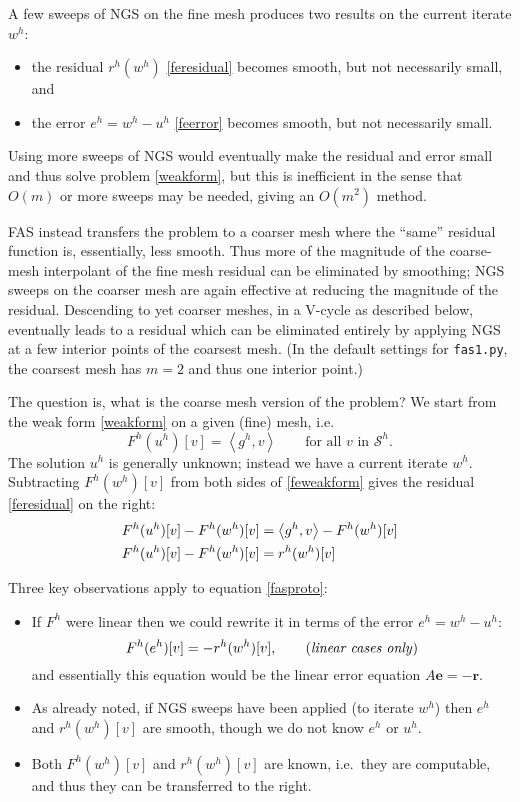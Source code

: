\documentclass[letterpaper,final,12pt,reqno]{amsart}
\newcommand{\be}{\mathbf{e}}
\newcommand{\br}{\mathbf{r}}
\newcommand{\ip}[2]{\left<#1,#2\right>}
\begin{document}
A few sweeps of NGS on the fine mesh produces two results on the current iterate $w^h$:
\begin{itemize}
\item the residual $r^h(w^h)$ \eqref{feresidual} becomes smooth, but not necessarily small, and
\item the error $e^h = w^h - u^h$ \eqref{feerror} becomes smooth, but not necessarily small.
\end{itemize}
Using more sweeps of NGS would eventually make the residual and error small and thus solve problem \eqref{weakform}, but this is inefficient in the sense that $O(m)$ or more sweeps may be needed, giving an $O(m^2)$ method.

FAS instead transfers the problem to a coarser mesh where the ``same'' residual function is, essentially, less smooth.  Thus more of the magnitude of the coarse-mesh interpolant of the fine mesh residual can be eliminated by smoothing; NGS sweeps on the coarser mesh are again effective at reducing the magnitude of the residual.  Descending to yet coarser meshes, in a V-cycle as described below, eventually leads to a residual which can be eliminated entirely by applying NGS at a few interior points of the coarsest mesh.  (In the default settings for \texttt{fas1.py}, the coarsest mesh has $m=2$ and thus one interior point.)

The question is, what is the coarse mesh version of the problem?  We start from the weak form \eqref{weakform} on a given (fine) mesh, i.e.
\begin{equation}
  F^h(u^h)[v] = \ip{g^h}{v} \qquad \text{for all } v \text{ in } \mathcal{S}^h.  \label{feweakform}
\end{equation}
The solution $u^h$ is generally unknown; instead we have a current iterate $w^h$.  Subtracting $F^h(w^h)[v]$ from both sides of \eqref{feweakform} gives the residual \eqref{feresidual} on the right:
\begin{align}
  F^h(u^h)[v] - F^h(w^h)[v] &= \ip{g^h}{v} - F^h(w^h)[v] \notag \\
  F^h(u^h)[v] - F^h(w^h)[v] &= r^h(w^h)[v] \label{fasproto}
\end{align}

Three key observations apply to equation \eqref{fasproto}:
\begin{itemize}
\item If $F^h$ were linear then we could rewrite it in terms of the error $e^h=w^h-u^h$:
    $$F^h(e^h)[v] = -r^h(w^h)[v], \qquad (\text{\emph{linear cases only}})$$
and essentially this equation would be the linear error equation $A\be=-\br$.
\item As already noted, if NGS sweeps have been applied (to iterate $w^h$) then $e^h$ and $r^h(w^h)[v]$ are smooth, though we do not know $e^h$ or $u^h$.
\item Both $F^h(w^h)[v]$ and $r^h(w^h)[v]$ are known, i.e.~they are computable, and thus they can be transferred to the right.
\end{itemize}
\end{document}
